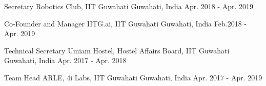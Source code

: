 

\begin{cvposition}

  \cvhonor
    {Secretary} %
    {Robotics Club, IIT Guwahati} %
    {Guwahati, India} %
    {Apr. 2018 - Apr. 2019} %

  \cvhonor
    {Co-Founder and Manager} %
    {IITG.ai, IIT Guwahati} %
    {Guwahati, India} %
    {Feb.2018 - Apr. 2019} %

  \cvhonor
    {Technical Secretary} %
    {Umiam Hostel, Hostel Affairs Board, IIT Guwahati} %
    {Guwahati, India} %
    {Apr. 2017 - Apr. 2018} %

  \cvhonor
    {Team Head} %
    {ARLE, 4i Labs, IIT Guwahati} %
    {Guwahati, India} %
    {Apr. 2017 - Apr. 2019} %

\end{cvposition}
